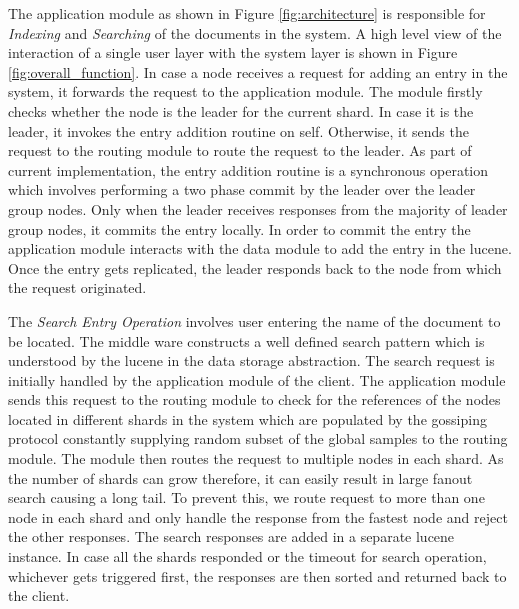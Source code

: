\documentclass[12pt,a4paper,twoside,openright]{book}
\begin{document}
\par The application module as shown in Figure \ref{fig:architecture} is responsible for \textit{Indexing} and \textit{Searching} of the documents in the system. A high level view of the interaction of a single user layer with the system layer is shown in Figure \ref{fig:overall_function}. In case a node receives a request for adding an entry in the system, it forwards the request to the application module. The module firstly checks whether the node is the leader for the current shard. In case it is the leader, it invokes the entry addition routine on self. Otherwise, it sends the request to the routing module to route the request to the leader. As part of current implementation, the entry addition routine is a synchronous operation which involves performing a two phase commit by the leader over the leader group nodes. Only when the leader receives responses from the majority of leader group nodes, it commits the entry locally. In order to commit the entry the application module interacts with the data module to add the entry in the lucene. Once the entry gets replicated, the leader responds back to the node from which the request originated. 

\par The \textit{Search Entry Operation} involves user entering the name of the document to be located. The middle ware constructs a well defined search pattern which is understood by the lucene in the data storage abstraction. The search request is initially handled by the application module of the client. The application module sends this request to the routing module to check for the references of the nodes located in different shards in the system which are populated by the gossiping protocol constantly supplying random subset of the global samples to the routing module. The module then routes the request to multiple nodes in each shard. As the number of shards can grow therefore, it can easily result in large fanout search causing a long tail. To prevent this, we route request to more than one node in each shard and only handle the response from the fastest node and reject the other responses. The search responses are added in a separate lucene instance. In case all the shards responded or the timeout for search operation, whichever gets triggered first, the responses are then sorted and returned back to the client. 
\end{document}
